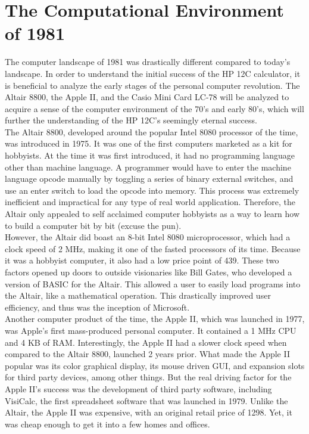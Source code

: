 \documentclass{article}
\begin{document}
\section{The Computational Environment of 1981}
\label{The Computational Environment of 1981}

The computer landscape of 1981 was drastically different compared to today’s landscape.  In order to understand the initial success of the HP 12C calculator, it is beneficial to analyze the early stages of the personal computer revolution.  The Altair 8800, the Apple II, and the Casio Mini Card LC-78 will be analyzed to acquire a sense of the computer environment of the 70’s and early 80’s, which will further the understanding of the HP 12C’s seemingly eternal success.\\

The Altair 8800, developed around the popular Intel 8080 processor of the time, was introduced in 1975.  It was one of the first computers marketed as a kit for hobbyists.  At the time it was first introduced, it had no programming language other than machine language.  A programmer would have to enter the machine language opcode manually by toggling a series of binary external switches, and use an enter switch to load the opcode into memory.  This process was extremely inefficient and impractical for any type of real world application.  Therefore, the Altair only appealed to self acclaimed computer hobbyists as a way to learn how to build a computer bit by bit (excuse the pun).\\

However, the Altair did boast an 8-bit Intel 8080 microprocessor, which had a clock speed of 2 MHz, making it one of the fasted processors of its time.  Because it was a hobbyist computer, it also had a low price point of 439.   These two factors opened up doors to outside visionaries like Bill Gates, who developed a version of BASIC for the Altair. This allowed a user to easily load programs into the Altair, like a mathematical operation.  This drastically improved user efficiency, and thus was the inception of Microsoft.\\

Another computer product of the time, the Apple II, which was launched in 1977, was Apple’s first mass-produced personal computer.  It contained a 1 MHz CPU and 4 KB of RAM.  Interestingly, the Apple II had a slower clock speed when compared to the Altair 8800, launched 2 years prior.  What made the Apple II popular was its color graphical display, its mouse driven GUI, and expansion slots for third party devices, among other things.  But the real driving factor for the Apple II’s success was the development of third party software, including VisiCalc, the first spreadsheet software that was launched in 1979.  Unlike the Altair, the Apple II was expensive, with an original retail price of 1298.  Yet, it was cheap enough to get it into a few homes and offices.\\
\end{document}
